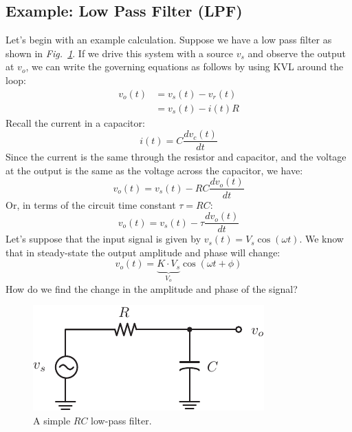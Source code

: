 \subsection{Example:  Low Pass Filter (LPF)}
Let's begin with an example calculation.  Suppose we have a low pass filter as shown in \emph{Fig.~\ref{fig:lpf}}.  If we drive this system with a source $v_s$ and observe the output at $v_o$, we can write the governing equations as follows by using KVL around the loop:
    \begin{align*}
        v_o(t) &= v_s(t) - v_r(t)\\
        &= v_s(t) - i(t) R
    \end{align*}
Recall the current in a capacitor:
    \begin{equation}
        i(t) = C \frac{dv_c(t)}{dt} \label{eq:cap_curr}
    \end{equation}
Since the current is the same through the resistor and capacitor, and the voltage at the output is the same as the voltage across the capacitor, we have:
    \begin{equation*}
        v_o(t) = v_s(t) - RC \frac{dv_o(t)}{dt}
    \end{equation*}
Or, in terms of the circuit time constant $\tau = RC$:
    \begin{equation}
        v_o(t) = v_s(t) - \tau \frac{dv_o(t)}{dt} \label{eq:lpf_diff}
    \end{equation}
Let's suppose that the input signal is given by $v_s(t) = V_s \cos(\omega t)$.  We know that in steady-state  the output amplitude and phase will change: 
    \begin{equation}
        v_o(t) = \underbrace{K \cdot V_s}_{V_o} \cos(\omega t + \phi) \label{eq:kvl1}
    \end{equation}  
How do we find the change in the amplitude and phase of the signal?
\begin{figure}[tb]
\centering
\includegraphics[scale=1]{lpf}
\caption{A simple $RC$ low-pass filter. }
\label{fig:lpf}
\end{figure}
